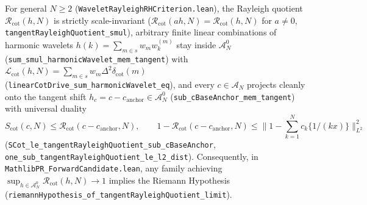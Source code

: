 \documentclass[11pt,a4paper]{article}
\theoremstyle{definition}
\begin{document}
For general $N \ge 2$ (\texttt{Wavelet\allowbreak Rayleigh\allowbreak RHCriterion.lean}), the Rayleigh quotient $\mathcal{R}_{\mathrm{cot}}(h, N)$ is strictly scale-invariant ($\mathcal{R}_{\mathrm{cot}}(a h, N) = \mathcal{R}_{\mathrm{cot}}(h, N)$ for $a \ne 0$, \texttt{tangentRayleighQuotient\_\allowbreak smul}), arbitrary finite linear combinations of harmonic wavelets $h(k) = \sum_{m \in s} w_m w_k^{(m)}$ stay inside $\mathcal{A}_N^0$ (\texttt{sum\_\allowbreak smul\_\allowbreak harmonicWavelet\_\allowbreak mem\_\allowbreak tangent}) with $\mathcal{L}_{\mathrm{cot}}(h, N) = \sum_{m \in s} w_m \Delta^2 \delta_{\mathrm{cot}}(m)$ (\texttt{linearCotDrive\_\allowbreak sum\_\allowbreak harmonicWavelet\_\allowbreak eq}), and every $c \in \mathcal{A}_N$ projects cleanly onto the tangent shift $h_c = c - c_{\mathrm{anchor}} \in \mathcal{A}_N^0$ (\texttt{sub\_\allowbreak cBaseAnchor\_\allowbreak mem\_\allowbreak tangent}) with universal duality
\begin{equation}
S_{\mathrm{cot}}(c, N) \le \mathcal{R}_{\mathrm{cot}}(c - c_{\mathrm{anchor}}, N), \qquad 1 - \mathcal{R}_{\mathrm{cot}}(c - c_{\mathrm{anchor}}, N) \le \|1 - \textstyle\sum_{k=1}^N c_k \{1/(kx)\}\|_{L^2}^2
\end{equation}
(\texttt{SCot\_\allowbreak le\_\allowbreak tangent\allowbreak Rayleigh\allowbreak Quotient\_\allowbreak sub\_\allowbreak cBase\allowbreak Anchor}, \texttt{one\_\allowbreak sub\_\allowbreak tangent\allowbreak Rayleigh\allowbreak Quotient\_\allowbreak le\_\allowbreak l2\_\allowbreak dist}). Consequently, in \texttt{MathlibPR\_\allowbreak Forward\allowbreak Candidate.lean}, any family achieving $\sup_{h \in \mathcal{A}_N^0}\allowbreak \mathcal{R}_{\mathrm{cot}}(h, N)\allowbreak \to 1$ implies the Riemann Hypothesis (\texttt{riemann\allowbreak Hypothesis\_\allowbreak of\_\allowbreak tangent\allowbreak Rayleigh\allowbreak Quotient\_\allowbreak limit}).
\end{document}
